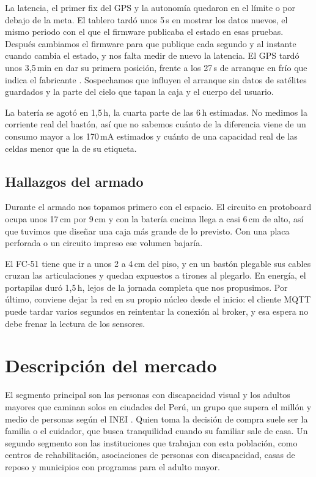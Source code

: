 \documentclass[conference,a4paper]{IEEEtran}
\begin{document}
La latencia, el primer fix del GPS y la autonomía quedaron en el límite o por debajo de la meta. El tablero tardó unos 5\,s en mostrar los datos nuevos, el mismo periodo con el que el firmware publicaba el estado en esas pruebas. Después cambiamos el firmware para que publique cada segundo y al instante cuando cambia el estado, y nos falta medir de nuevo la latencia. El GPS tardó unos 3,5\,min en dar su primera posición, frente a los 27\,s de arranque en frío que indica el fabricante \cite{neo6m}. Sospechamos que influyen el arranque sin datos de satélites guardados y la parte del cielo que tapan la caja y el cuerpo del usuario.

La batería se agotó en 1,5\,h, la cuarta parte de las 6\,h estimadas. No medimos la corriente real del bastón, así que no sabemos cuánto de la diferencia viene de un consumo mayor a los 170\,mA estimados y cuánto de una capacidad real de las celdas menor que la de su etiqueta.

\subsection{Hallazgos del armado}

Durante el armado nos topamos primero con el espacio. El circuito en protoboard ocupa unos 17\,cm por 9\,cm y con la batería encima llega a casi 6\,cm de alto, así que tuvimos que diseñar una caja más grande de lo previsto. Con una placa perforada o un circuito impreso ese volumen bajaría.

El FC-51 tiene que ir a unos 2 a 4\,cm del piso, y en un bastón plegable sus cables cruzan las articulaciones y quedan expuestos a tirones al plegarlo. En energía, el portapilas duró 1,5\,h, lejos de la jornada completa que nos propusimos. Por último, conviene dejar la red en su propio núcleo desde el inicio: el cliente MQTT puede tardar varios segundos en reintentar la conexión al broker, y esa espera no debe frenar la lectura de los sensores.

\section{Descripción del mercado}

El segmento principal son las personas con discapacidad visual y los adultos mayores que caminan solos en ciudades del Perú, un grupo que supera el millón y medio de personas según el INEI \cite{inei}. Quien toma la decisión de compra suele ser la familia o el cuidador, que busca tranquilidad cuando su familiar sale de casa. Un segundo segmento son las instituciones que trabajan con esta población, como centros de rehabilitación, asociaciones de personas con discapacidad, casas de reposo y municipios con programas para el adulto mayor.
\end{document}
